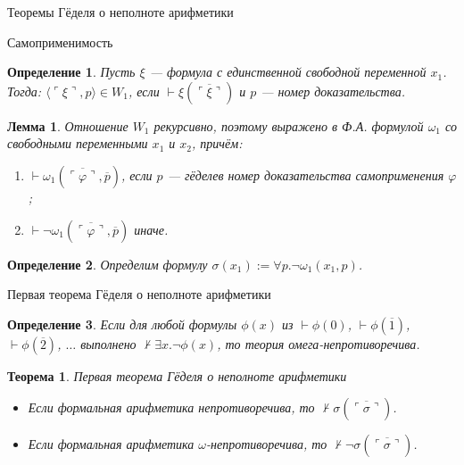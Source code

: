 \documentclass[aspectratio=169]{beamer}
\newtheorem{thm}{Теорема}[section]
\newtheorem{dfn}{Определение}[section]
\newtheorem{lmm}{Лемма}[section]
\begin{document}
\newcommand\doubleplus{+\kern-1.3ex+\kern0.8ex}
\newcommand\mdoubleplus{\ensuremath{\mathbin{+\mkern-10mu+}}}

\begin{frame}{}
\LARGE\begin{center}Теоремы Гёделя о неполноте арифметики\end{center}
\end{frame}

\begin{frame}{Самоприменимость}
\begin{dfn}Пусть $\xi$ --- формула с единственной свободной
переменной $x_1$. Тогда:
$\langle\ulcorner \xi \urcorner,p\rangle \in W_1$, если $\vdash \xi(\overline{\ulcorner \xi \urcorner})$ и $p$ --- номер доказательства.
\end{dfn}

\begin{lmm}Отношение $W_1$ рекурсивно, поэтому выражено в Ф.А. формулой $\omega_1$ со свободными переменными $x_1$ и $x_2$, причём:
\begin{enumerate}
\item $\vdash \omega_1(\overline{\ulcorner \varphi \urcorner},\overline{p})$, если $p$ --- гёделев номер
доказательства самоприменения $\varphi$;
\item $\vdash \neg\omega_1(\overline{\ulcorner \varphi \urcorner},\overline{p})$ иначе.
\end{enumerate}
\end{lmm}

\begin{dfn}
Определим формулу $\sigma(x_1) := \forall p.\neg\omega_1(x_1,p)$. 
\end{dfn}
\end{frame}

\begin{frame}{Первая теорема Гёделя о неполноте арифметики}
\begin{dfn}Если для любой формулы $\phi(x)$ из $\vdash\phi(0)$, $\vdash\phi(\overline{1})$,
$\vdash\phi(\overline{2})$, $\dots$ выполнено $\not\vdash\exists x.\neg\phi(x)$, 
то теория \emph{омега-непротиворечива}.
\end{dfn}

\begin{thm}{Первая теорема Гёделя о неполноте арифметики}
\begin{itemize}
\item Если формальная арифметика непротиворечива, то $\not\vdash\sigma(\overline{\ulcorner\sigma\urcorner})$.
\item Если формальная арифметика $\omega$-непротиворечива, то $\not\vdash\neg\sigma(\overline{\ulcorner\sigma\urcorner})$.
\end{itemize}
\end{thm}
\end{frame}
\end{document}
